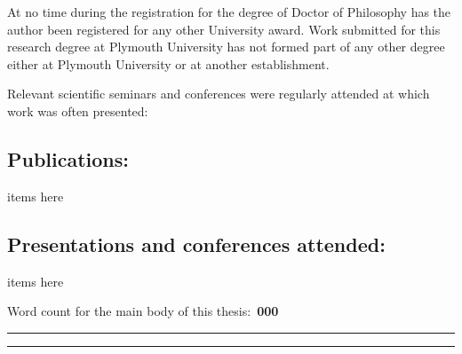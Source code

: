 At no time during the registration for the degree of Doctor of Philosophy has the author been registered for any other University award. Work submitted for this research degree at Plymouth University has not formed part of any other degree either at Plymouth University or at another establishment.

Relevant scientific seminars and conferences were regularly attended at which work was often presented:

\subsection*{Publications:}
	\begin{description}
		\item items here
	\end{description}   
	    
\subsection*{Presentations and conferences attended:}
	\begin{description}
		\item items here
	\end{description}
	
Word count for the main body of this thesis:~\textbf{000}

\vspace{1.0cm}

\rule{0.4\textwidth}{0.3pt}

\vspace{1cm} 

\rule{0.4\textwidth}{0.3pt}